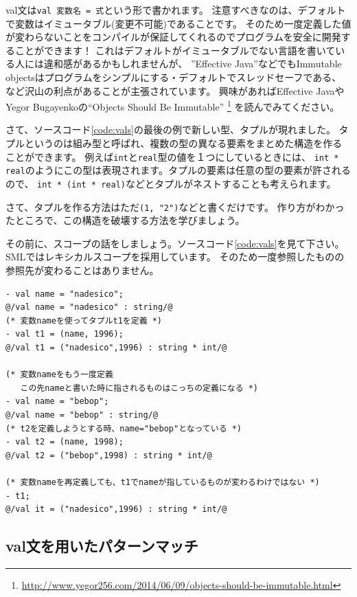 \documentclass[11pt,a4paper]{article}
\begin{document}
val文は\lstinline{val 変数名 = 式}という形で書かれます。
注意すべきなのは、デフォルトで変数はイミュータブル(変更不可能)であることです。
そのため一度定義した値が変わらないことをコンパイルが保証してくれるのでプログラムを安全に開発することができます！
これはデフォルトがイミュータブルでない言語を書いている人には違和感があるかもしれませんが、
''Effective Java''などでもImmutable objectsはプログラムをシンプルにする・デフォルトでスレッドセーフである、
など沢山の利点があることが主張されています。
興味があればEffective JavaやYegor Bugayenkoの``Objects Should Be Immutable''
\footnote{\url{http://www.yegor256.com/2014/06/09/objects-should-be-immutable.html}}
を読んでみてください。

さて、ソースコード\ref{code:vals}の最後の例で新しい型、タプルが現れました。
タプルというのは組み型と呼ばれ、複数の型の異なる要素をまとめた構造を作ることができます。
例えば\lstinline{int}と\lstinline{real}型の値を１つにしているときには、
\lstinline{int * real}のようにこの型は表現されます。タプルの要素は任意の型の要素が許されるので、
\lstinline{int * (int * real)}などとタプルがネストすることも考えられます。

さて、タプルを作る方法はただ\lstinline{(1, "2")}などと書くだけです。
作り方がわかったところで、この構造を破壊する方法を学びましょう。

その前に、スコープの話をしましょう。ソースコード\ref{code:vals}を見て下さい。
SMLではレキシカルスコープを採用しています。
そのため一度参照したものの参照先が変わることはありません。

\begin{lstlisting}[caption=valのスコープ,label=code:vals]
- val name = "nadesico";
@/val name = "nadesico" : string/@
(* 変数nameを使ってタプルt1を定義 *)
- val t1 = (name, 1996);
@/val t1 = ("nadesico",1996) : string * int/@

(* 変数nameをもう一度定義
   この先nameと書いた時に指されるものはこっちの定義になる *)
- val name = "bebop";
@/val name = "bebop" : string/@
(* t2を定義しようとする時、name="bebop"となっている *)
- val t2 = (name, 1998);
@/val t2 = ("bebop",1998) : string * int/@

(* 変数nameを再定義しても、t1でnameが指しているものが変わるわけではない *)
- t1;
@/val it = ("nadesico",1996) : string * int/@
\end{lstlisting}



\subsection{val文を用いたパターンマッチ}
\end{document}
